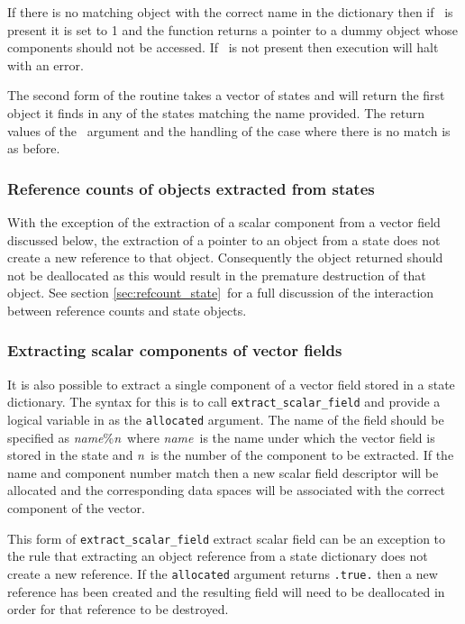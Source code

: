 \documentclass[a4paper, 11pt]{book}
\begin{document}
If there is no matching object with the correct name in the dictionary then
if \stat\ is present it is set to 1 and the function returns a pointer to a
dummy object whose components should not be accessed. If \stat\ is not
present then execution will halt with an error.

The second form of the routine takes a vector of states and will return the
first object it finds in any of the states matching the name provided. The
return values of the \stat\ argument and the handling of the case where
there is no match is as before.

\subsubsection{Reference counts of objects extracted from states}

With the exception of the extraction of a scalar component from a vector
field discussed below, the extraction of a pointer to an object from a state
does not create a new reference to that object. Consequently the object
returned should not be deallocated as this would result in the premature
destruction of that object. See section \ref{sec:refcount_state}\ for a full
discussion of the interaction between reference counts and state objects.


\subsubsection{Extracting scalar components of vector fields}

It is also possible to extract a single component of a vector field stored
in a state dictionary. The syntax for this is to call
\lstinline+extract_scalar_field+ and provide a logical variable in as the
\lstinline+allocated+ argument. The name of the field should be specified as
\emph{name}\%\emph{n}\ where \emph{name}\ is the name under which the vector
field is stored in the state and \emph{n}\ is the number of the component to
be extracted. If the name and component number match then a new scalar field
descriptor will be allocated and the corresponding data spaces will be
associated with the correct component of the vector.

This form of \lstinline+extract_scalar_field+ extract scalar field can be an
exception to the rule that extracting an object reference from a state
dictionary does not create a new reference. If the \lstinline+allocated+
argument returns \lstinline+.true.+ then a new reference has been created
and the resulting field will need to be deallocated in order for that
reference to be destroyed. 
\end{document}
